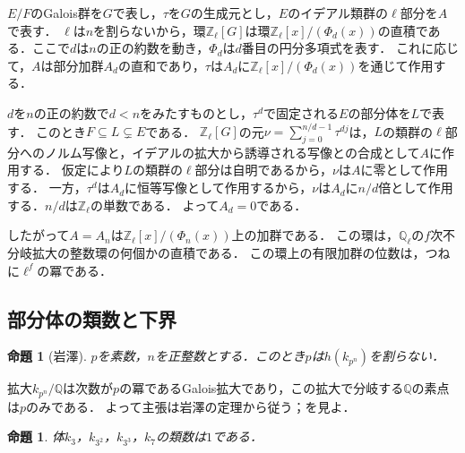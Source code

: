 \documentclass[11pt,a4paper]{ltjsarticle}
\makeatletter
\theoremstyle{ja}
\newtheorem{proposition}[theorem]{命題}
\renewenvironment{proof}[1][証明]{\par
  \pushQED{\qed}\normalfont \topsep6\p@\@plus6\p@\relax
  \trivlist
  \item[\hskip\labelsep\bfseries #1]\hspace{1\zw}\ignorespaces
}{\popQED\endtrivlist\@endpefalse}
\makeatother
\begin{document}
\begin{proof}
$E/F$のGalois群を$G$で表し，$\tau$を$G$の生成元とし，$E$のイデアル類群の$\ell$部分を$A$で表す．
$\ell$は$n$を割らないから，環$\mathbb{Z}_\ell[G]$は環$\mathbb{Z}_\ell[x]/(\Phi_d(x))$の直積である．ここで$d$は$n$の正の約数を動き，$\Phi_d$は$d$番目の円分多項式を表す．
これに応じて，$A$は部分加群$A_d$の直和であり，$\tau$は$A_d$に$\mathbb{Z}_\ell[x]/(\Phi_d(x))$を通じて作用する．

$d$を$n$の正の約数で$d < n$をみたすものとし，$\tau^d$で固定される$E$の部分体を$L$で表す．
このとき$F \subseteq L \subsetneq E$である．
$\mathbb{Z}_\ell[G]$の元$\nu = \sum_{j=0}^{n/d-1} \tau^{dj}$は，$L$の類群の$\ell$部分へのノルム写像と，イデアルの拡大から誘導される写像との合成として$A$に作用する．
仮定により$L$の類群の$\ell$部分は自明であるから，$\nu$は$A$に零として作用する．
一方，$\tau^d$は$A_d$に恒等写像として作用するから，$\nu$は$A_d$に$n/d$倍として作用する．$n/d$は$\mathbb{Z}_\ell$の単数である．
よって$A_d = 0$である．

したがって$A = A_n$は$\mathbb{Z}_\ell[x]/(\Phi_n(x))$上の加群である．
この環は，$\mathbb{Q}_\ell$の$f$次不分岐拡大の整数環の何個かの直積である．
この環上の有限加群の位数は，つねに$\ell^f$の冪である．
\end{proof}

\subsection{部分体の類数と下界}

\begin{proposition}[岩澤] \label{prop:iwasawa}
$p$を素数，$n$を正整数とする．このとき$p$は$h(k_{p^n})$を割らない．
\end{proposition}

\begin{proof}
拡大$k_{p^n}/\mathbb{Q}$は次数が$p$の冪であるGalois拡大であり，この拡大で分岐する$\mathbb{Q}$の素点は$p$のみである．
よって主張は岩澤の定理\cite{Iw56}から従う；\cite[Theorem 10.4]{Wa97}を見よ．
\end{proof}

\begin{proposition} \label{prop:sub}
体$k_3$，$k_{3^2}$，$k_{3^3}$，$k_7$の類数は$1$である．
\end{proposition}
\end{document}
